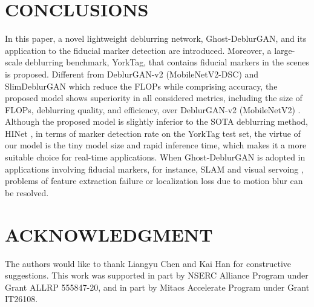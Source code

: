 \documentclass[letterpaper, 10 pt, conference]{ieeeconf}
\begin{document}
\section{CONCLUSIONS}
In this paper, a novel lightweight deblurring network, Ghost-DeblurGAN, and its application to the fiducial marker detection are introduced. Moreover, a large-scale deblurring benchmark, YorkTag, that contains fiducial markers in the scenes is proposed. Different from DeblurGAN-v2 (MobileNetV2-DSC) \cite{deblurgan2} and SlimDeblurGAN \cite{truong2020slimdeblurgan} which reduce the FLOPs while comprising accuracy, the proposed model shows superiority in all considered metrics, including the size of FLOPs, deblurring quality, and efficiency, over DeblurGAN-v2 (MobileNetV2) \cite{deblurgan2}. Although the proposed model is slightly inferior to the SOTA deblurring method, HINet \cite{chen2021hinet}, in terms of marker detection rate on the YorkTag test set, the virtue of our model is the tiny model size and rapid inference time, which makes it a more suitable choice for real-time applications. When Ghost-DeblurGAN is adopted in applications involving fiducial markers, for instance, SLAM \cite{munoz,munoz2019} and visual servoing \cite{yibo}, problems of feature extraction failure or localization loss due to motion blur can be resolved.

\section*{ACKNOWLEDGMENT}
The authors would like to thank Liangyu Chen and Kai Han for constructive suggestions. This work was supported in part by NSERC Alliance Program under Grant ALLRP 555847-20, and in part by Mitacs Accelerate Program under Grant IT26108.











 
 
\end{document}
